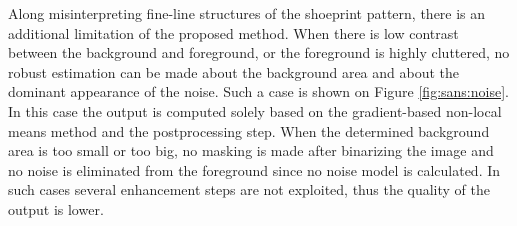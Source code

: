 \documentclass[draft,final]{vutinfth} %
\begin{document}
\par
Along misinterpreting fine-line structures of the shoeprint pattern, there is an additional limitation of the proposed method.
When there is low contrast between the background and foreground, or the foreground is highly cluttered, no robust estimation can be made about the background area and about the dominant appearance of the noise. 
Such a case is shown on Figure \ref{fig:sans:noise}.
In this case the output is computed solely based on the gradient-based non-local means method and the postprocessing step.
When the determined background area is too small or too big, no masking is made after binarizing the image and no noise is eliminated from the foreground since no noise model is calculated.
In such cases several enhancement steps are not exploited, thus the quality of the output is lower. 

\end{document}
